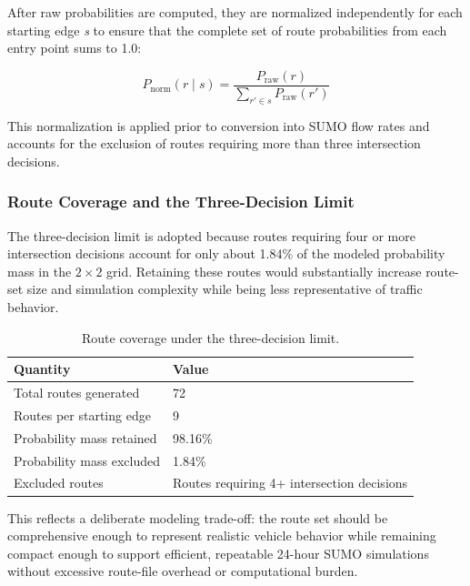 \documentclass[12pt]{article}
\begin{document}
After raw probabilities are computed, they are normalized independently for each starting edge \emph{s} to ensure that the complete set of route probabilities from each entry point sums to 1.0:

\begin{equation}
\label{eq:prob_norm}
    P_{\text{norm}}(r \mid s) = \frac{P_{\text{raw}}(r)}{\sum_{r'\in s} P_{\text{raw}}(r')}
\end{equation}


This normalization is applied prior to conversion into SUMO flow rates and accounts for the exclusion of routes requiring more than three intersection decisions.

\subsubsection{Route Coverage and the Three-Decision Limit}

The three-decision limit is adopted because routes requiring four or more intersection decisions account for only about 1.84\% of the modeled probability mass in the $2 \times 2$ grid. Retaining these routes would substantially increase route-set size and simulation complexity while being less representative of traffic behavior.


\begin{table}[H]
\centering
\begin{tabular}{@{} l l @{}}
\toprule
\textbf{Quantity} & \textbf{Value} \\
\midrule
Total routes generated & 72 \\

Routes per starting edge & 9 \\

Probability mass retained & 98.16\% \\

Probability mass excluded & 1.84\% \\

Excluded routes & Routes requiring 4+ intersection decisions \\
\bottomrule
\end{tabular}
\caption{Route coverage under the three-decision limit.}
\label{tab:route-coverage}
\end{table}

This reflects a deliberate modeling trade-off: the route set should be comprehensive enough to represent realistic vehicle behavior while remaining compact enough to support efficient, repeatable 24-hour SUMO simulations without excessive route-file overhead or computational burden.
\end{document}
